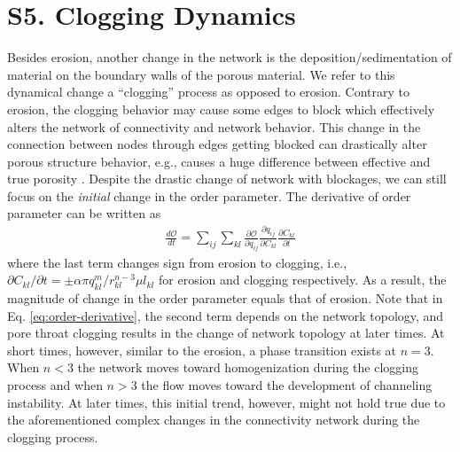 \documentclass[%
reprint,
 amsmath,amssymb,
 aps,
prl,
]{revtex4-1}
\begin{document}
\section{S5. Clogging Dynamics}
\label{s5}
% 
Besides erosion, another change in the network is the deposition/sedimentation of material on the boundary walls of the porous material. We refer to this dynamical change a ``clogging'' process as opposed to erosion. Contrary to erosion, the clogging behavior may cause some edges to block which effectively alters the network of connectivity and network behavior. This change in the connection between nodes through edges getting blocked can drastically alter porous structure behavior, e.g., causes a huge difference between effective and true porosity \cite{shima2021}. Despite the drastic change of network with blockages, we can still focus on the \textit{initial} change in the order parameter. The derivative of order parameter can be written as 
%
\begin{align}
    \frac{d\mathcal{O}}{dt} = \sum_{ij} \sum_{kl} \frac{\partial \mathcal{O}}{\partial q_{ij}} \frac{\partial q_{ij}}{\partial C_{kl}}  \frac{\partial C_{kl}}{\partial t} \label{eq:order-derivative}
\end{align}
%
where the last term changes sign from erosion to clogging, i.e., $\partial C_{kl}/\partial t = \pm \alpha \pi q^m_{kl} /r_{kl}^{n-3}\mu l_{kl}$ for erosion and clogging respectively. As a result, the magnitude of change in the order parameter equals that of erosion. Note that in Eq. \eqref{eq:order-derivative}, the second term depends on the network topology, and pore throat clogging results in the change of network topology at later times.
At short times, however, similar to the erosion, a phase transition exists at $n=3$. When  $n<3$ the network moves toward homogenization during the clogging process and when $n>3$ the flow moves toward the development of channeling instability. At later times, this initial trend, however, might not hold true due to the aforementioned complex changes in the connectivity network during the clogging process. 



\end{document}
